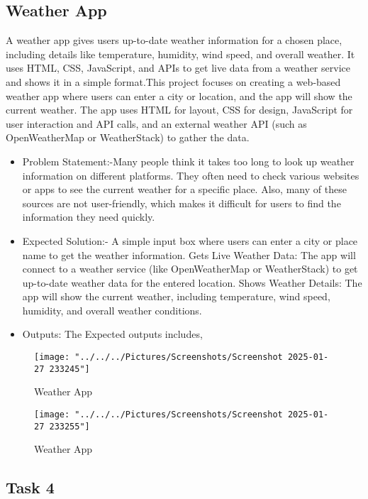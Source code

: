 \subsection*{Weather App}
A weather app gives users up-to-date weather information for a chosen place, including details like temperature, humidity, wind speed, and overall weather. It uses HTML, CSS, JavaScript, and APIs to get live data from a weather service and shows it in a simple format.This project focuses on creating a web-based weather app where users can enter a city or location, and the app will show the current weather. The app uses HTML for layout, CSS for design, JavaScript for user interaction and API calls, and an external weather API (such as OpenWeatherMap or WeatherStack) to gather the data.
\begin{itemize}
\item Problem Statement:-Many people think it takes too long to look up weather information on different platforms. They often need to check various websites or apps to see the current weather for a specific place. Also, many of these sources are not user-friendly, which makes it difficult for users to find the information they need quickly.
\item Expected Solution:- A simple input box where users can enter a city or place name to get the weather information.  Gets Live Weather Data: The app will connect to a weather service (like OpenWeatherMap or WeatherStack) to get up-to-date weather data for the entered location.  
Shows Weather Details: The app will show the current weather, including temperature, wind speed, humidity, and overall weather conditions.
\item Outputs: The Expected outputs includes,
\end{itemize}
\begin{figure}[tbph]
	\centering
	\texttt{[image: "../../../Pictures/Screenshots/Screenshot 2025-01-27 233245"]}
	\caption{Weather App}
	\label{fig:screenshot-2025-01-27-233245}
\end{figure}
\newpage
\begin{figure}[tbph]
	\centering
	\texttt{[image: "../../../Pictures/Screenshots/Screenshot 2025-01-27 233255"]}
	\caption{Weather App}
	\label{fig:screenshot-2025-01-27-233255}
\end{figure}
\subsection*{Task 4}
